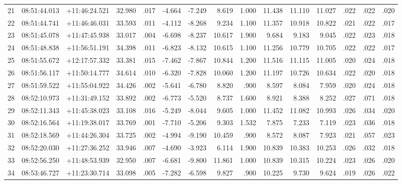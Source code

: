 \documentclass[a4paper,fleqn,usenatbib]{mnras}
\begin{document}
\begin{landscape}
\begin{table}
\begin{tabular}{|r|r|r|r|r|r|r|r|r|r|r|r|r|r|r|}
  21 & 08:51:44.013 & +11:46:24.521 & 32.980 & .017 & -4.664 & -7.249 & 8.619 & 1.000 & 11.438 & 11.110 & 11.027 & .022 & .022 & .020\\
  22 & 08:51:44.741 & +11:46:46.031 & 33.593 & .011 & -4.112 & -8.268 & 9.234 & 1.100 & 11.357 & 10.918 & 10.822 & .021 & .022 & .017\\
  23 & 08:51:45.078 & +11:47:45.938 & 33.017 & .004 & -6.698 & -8.237 & 10.617 & 1.900 & 9.684 & 9.183 & 9.045 & .022 & .023 & .018\\
  24 & 08:51:48.838 & +11:56:51.191 & 34.398 & .011 & -6.823 & -8.132 & 10.615 & 1.100 & 11.256 & 10.779 & 10.705 & .022 & .022 & .017\\
  25 & 08:51:55.672 & +12:17:57.332 & 33.381 & .015 & -7.462 & -7.867 & 10.844 & 1.200 & 11.516 & 11.115 & 11.005 & .020 & .024 & .018\\
  26 & 08:51:56.117 & +11:50:14.777 & 34.614 & .010 & -6.320 & -7.828 & 10.060 & 1.200 & 11.197 & 10.726 & 10.634 & .022 & .020 & .018\\
  27 & 08:51:59.522 & +11:55:04.922 & 34.426 & .002 & -5.641 & -6.780 & 8.820 & .900 & 8.597 & 8.084 & 7.959 & .020 & .024 & .018\\
  28 & 08:52:10.973 & +11:31:49.152 & 33.892 & .002 & -6.773 & -5.520 & 8.737 & 1.600 & 8.921 & 8.388 & 8.252 & .027 & .071 & .018\\
  29 & 08:52:11.343 & +11:45:38.023 & 33.108 & .016 & -5.249 & -8.044 & 9.605 & 1.000 & 11.452 & 11.082 & 10.993 & .026 & .034 & .020\\
  30 & 08:52:16.564 & +11:19:38.017 & 33.769 & .001 & -7.710 & -5.206 & 9.303 & 1.532 & 7.875 & 7.233 & 7.119 & .023 & .036 & .018\\
  31 & 08:52:18.569 & +11:44:26.304 & 33.725 & .002 & -4.994 & -9.190 & 10.459 & .900 & 8.572 & 8.087 & 7.923 & .021 & .057 & .023\\
  32 & 08:52:20.030 & +11:27:36.252 & 33.946 & .007 & -4.690 & -3.923 & 6.114 & 1.900 & 10.839 & 10.383 & 10.253 & .026 & .032 & .018\\
  33 & 08:52:56.250 & +11:48:53.939 & 32.950 & .007 & -6.681 & -9.800 & 11.861 & 1.000 & 10.839 & 10.315 & 10.224 & .023 & .026 & .020\\
  34 & 08:53:46.727 & +11:23:30.714 & 33.098 & .005 & -7.282 & -6.598 & 9.827 & .900 & 10.225 & 9.730 & 9.624 & .019 & .026 & .022\\
	\hline\end{tabular}
\label{tab:members_par}
\end{table}
\end{landscape}
\end{document}

